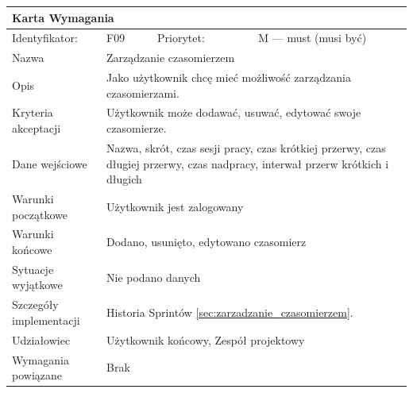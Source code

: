 \documentclass[a4paper,11pt]{report}
\begin{document}
		\begin{tabular}{|p{3cm}|p{2cm}|p{2cm}|p{6cm}|}
		\hline
		\multicolumn{4}{|p{12 cm}|}{Karta Wymagania}\\
		\hline
		Identyfikator: & F09 & Priorytet: & M — must (musi być)\\
		\hline
		Nazwa & \multicolumn{3}{|p{10 cm}|}{Zarządzanie czasomierzem}\\
		\hline
		Opis & \multicolumn{3}{|p{10 cm}|}{Jako użytkownik chcę mieć możliwość zarządzania czasomierzami.}\\
		\hline
		Kryteria akceptacji & \multicolumn{3}{|p{10 cm}|}{Użytkownik może dodawać, usuwać, edytować swoje czasomierze.}\\
		\hline
		Dane wejściowe & \multicolumn{3}{|p{10 cm}|}{Nazwa, skrót, czas sesji pracy, czas krótkiej przerwy, czas długiej przerwy, czas nadpracy, interwał przerw krótkich i długich}\\
		\hline
		Warunki początkowe & \multicolumn{3}{|p{10 cm}|}{Użytkownik jest zalogowany}\\
		\hline
		Warunki końcowe & \multicolumn{3}{|p{10 cm}|}{Dodano, usunięto, edytowano czasomierz}\\
		\hline
		Sytuacje wyjątkowe & \multicolumn{3}{|p{10 cm}|}{Nie podano danych}\\
		\hline
		Szczegóły implementacji & \multicolumn{3}{|p{10 cm}|}{Historia Sprintów \ref{sec:zarzadzanie_czasomierzem}.}\\
		\hline
		Udziałowiec & \multicolumn{3}{|p{10 cm}|}{Użytkownik końcowy, Zespół projektowy}\\
		\hline
		Wymagania powiązane & \multicolumn{3}{|p{10 cm}|}{Brak}\\
		\hline
		\end{tabular}
		\newline
		\vspace*{0,2 cm}
		\newline
\end{document}

